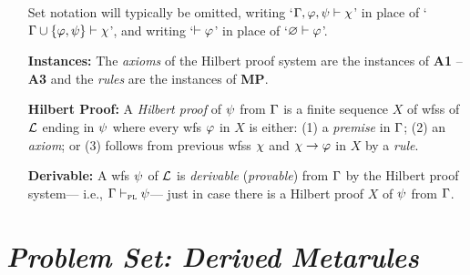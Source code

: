 \documentclass[a4paper, 11pt]{article} %
\begin{document}
\begin{enumerate}[leftmargin=1.2in]
\begin{itemize}[leftmargin=.5in]
	      \end{itemize}
	      Set notation will typically be omitted, writing `$\Gamma, \varphi, \psi \vdash \chi$' in place of `$\Gamma\cup\lbrace\varphi,\psi\rbrace \vdash \chi$', and writing `$\vdash \varphi$' in place of `$\varnothing \vdash\varphi$'.
	\item[\bf Instances:] The \textit{axioms} of the Hilbert proof system are the instances of \textbf{A1} -- \textbf{A3} and the \textit{rules} are the instances of \textbf{MP}.
	\item[\bf Hilbert Proof:] A \textit{Hilbert proof} of $\psi$ from $\Gamma$ is a finite sequence $X$ of wfss of $\mathcal{L}$ ending in $\psi$ where every wfs $\varphi$ in $X$ is either: (1) a \textit{premise} in $\Gamma$; (2) an \textit{axiom}; or (3) follows from previous wfss $\chi$ and $\chi \rightarrow \varphi$ in $X$ by a \textit{rule}.
	\item[\bf Derivable:] A wfs $\psi$ of $\mathcal{L}$ is \textit{derivable} (\textit{provable}) from $\Gamma$ by the Hilbert proof system--- i.e., $\Gamma \vdash_{\textsc{pl}} \psi$--- just in case there is a Hilbert proof $X$ of $\psi$ from $\Gamma$.
\end{enumerate}



\section*{\it Problem Set: Derived Metarules}
\end{document}
